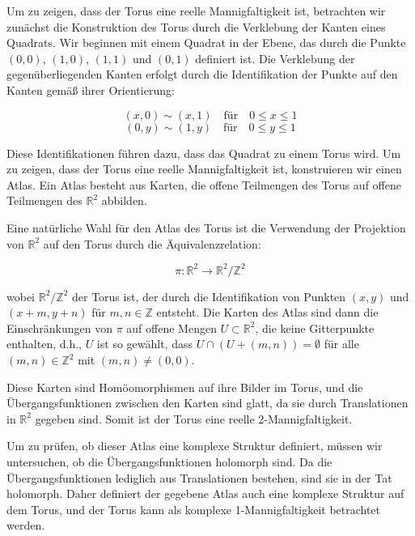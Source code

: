 Um zu zeigen, dass der Torus eine reelle Mannigfaltigkeit ist, betrachten wir zunächst die Konstruktion des Torus durch die Verklebung der Kanten eines Quadrats. Wir beginnen mit einem Quadrat in der Ebene, das durch die Punkte \( (0,0) \), \( (1,0) \), \( (1,1) \) und \( (0,1) \) definiert ist. Die Verklebung der gegenüberliegenden Kanten erfolgt durch die Identifikation der Punkte auf den Kanten gemäß ihrer Orientierung: 

\[
(x,0) \sim (x,1) \quad \text{für} \quad 0 \leq x \leq 1
\]
\[
(0,y) \sim (1,y) \quad \text{für} \quad 0 \leq y \leq 1
\]

Diese Identifikationen führen dazu, dass das Quadrat zu einem Torus wird. Um zu zeigen, dass der Torus eine reelle Mannigfaltigkeit ist, konstruieren wir einen Atlas. Ein Atlas besteht aus Karten, die offene Teilmengen des Torus auf offene Teilmengen des \(\mathbb{R}^2\) abbilden.

Eine natürliche Wahl für den Atlas des Torus ist die Verwendung der Projektion von \(\mathbb{R}^2\) auf den Torus durch die Äquivalenzrelation:

\[
\pi: \mathbb{R}^2 \to \mathbb{R}^2 / \mathbb{Z}^2
\]

wobei \(\mathbb{R}^2 / \mathbb{Z}^2\) der Torus ist, der durch die Identifikation von Punkten \((x,y)\) und \((x+m, y+n)\) für \(m, n \in \mathbb{Z}\) entsteht. Die Karten des Atlas sind dann die Einschränkungen von \(\pi\) auf offene Mengen \(U \subset \mathbb{R}^2\), die keine Gitterpunkte enthalten, d.h., \(U\) ist so gewählt, dass \(U \cap (U + (m,n)) = \emptyset\) für alle \((m,n) \in \mathbb{Z}^2\) mit \((m,n) \neq (0,0)\).

Diese Karten sind Homöomorphismen auf ihre Bilder im Torus, und die Übergangsfunktionen zwischen den Karten sind glatt, da sie durch Translationen in \(\mathbb{R}^2\) gegeben sind. Somit ist der Torus eine reelle 2-Mannigfaltigkeit.

Um zu prüfen, ob dieser Atlas eine komplexe Struktur definiert, müssen wir untersuchen, ob die Übergangsfunktionen holomorph sind. Da die Übergangsfunktionen lediglich aus Translationen bestehen, sind sie in der Tat holomorph. Daher definiert der gegebene Atlas auch eine komplexe Struktur auf dem Torus, und der Torus kann als komplexe 1-Mannigfaltigkeit betrachtet werden.